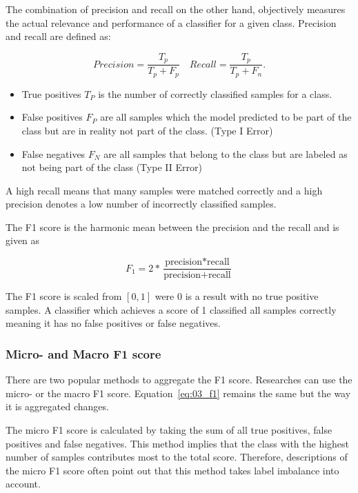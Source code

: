 The combination of precision and recall on the other hand, objectively measures the actual relevance and performance of a classifier for a given class. Precision and recall are defined as:

\begin{equation}
Precision = \frac{T_p}{T_p+F_p} \quad Recall = \frac{T_p}{T_p+F_n}.
\end{equation}

\begin{itemize}
    \item True positives $T_P$ is the number of correctly classified samples for a class.
    \item False positives $F_P$ are all samples which the model predicted to be part of the class but are in reality not part of the class. {(Type I Error)}
    \item False negatives $F_N$ are all samples that belong to the class but are labeled as not being part of the class {(Type II Error)}
\end{itemize}

A high recall means that many samples were matched correctly and a high precision denotes a low number of incorrectly classified samples.
\medskip

The F1 score is the harmonic mean between the precision and the recall and is given as

\begin{equation}
    F_1 = 2 * \frac{\text{precision}*\text{recall}}{\text{precision}+\text{recall}}
\label{eq:03_f1}
\end{equation}

The F1 score is scaled from $[0, 1]$ were 0 is a result with no true positive samples. A classifier which achieves a score of 1 classified all samples correctly meaning it has no false positives or false negatives.

\subsubsection*{Micro- and Macro F1 score}
\label{sec:03_macroMicroF1}
There are two popular methods to aggregate the F1 score. Researches can use the micro- or the macro F1 score. Equation~\ref{eq:03_f1} remains the same but the way it is aggregated changes. 
\medskip

The micro F1 score is calculated by taking the sum of all true positives, false positives and false negatives. This method implies that the class with the highest number of samples contributes most to the total score. Therefore, descriptions of the micro F1 score often point out that this method takes label imbalance into account. 

